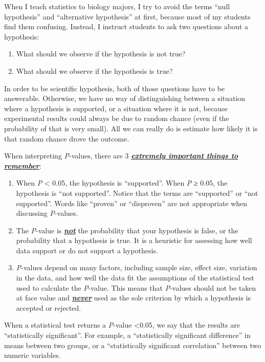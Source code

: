 \documentclass[
  13,
  letterpaper,
]{report}
\begin{document}
When I teach statistics to biology majors, I try to avoid the terms
``null hypothesis'' and ``alternative hypothesis'' at first, because
most of my students find them confusing. Instead, I instruct students to
ask two questions about a hypothesis:

\begin{enumerate}
\def\labelenumi{\arabic{enumi}.}
\item
  What should we observe if the hypothesis is not true?
\item
  What should we observe if the hypothesis is true?
\end{enumerate}

In order to be scientific hypothesis, both of those questions have to be
answerable. Otherwise, we have no way of distinguishing between a
situation where a hypothesis is supported, or a situation where it is
not, because experimental results could always be due to random chance
(even if the probability of that is very small). All we can really do is
estimate how likely it is that random chance drove the outcome.

When interpreting \emph{P}-values, there are 3
\ul{\textbf{\emph{extremely important things to remember}}}:

\begin{enumerate}
\def\labelenumi{\arabic{enumi}.}
\item
  When \emph{P} \textless{} 0.05, the hypothesis is ``supported''. When
  \emph{P} ≥ 0.05, the hypothesis is ``not supported''. Notice that the
  terms are ``supported'' or ``not supported''. Words like ``proven'' or
  ``disproven'' are not appropriate when discussing \emph{P}-values.
\item
  The \emph{P}-value is \ul{\textbf{\emph{not}}} the probability that
  your hypothesis is false, or the probability that a hypothesis is
  true. It is a heuristic for assessing how well data support or do not
  support a hypothesis.
\item
  \emph{P}-values depend on many factors, including sample size, effect
  size, variation in the data, and how well the data fit the assumptions
  of the statistical test used to calculate the \emph{P}-value. This
  means that \emph{P}-values should not be taken at face value and
  \ul{\textbf{\emph{never}}} used as the sole criterion by which a
  hypothesis is accepted or rejected.
\end{enumerate}

When a statistical test returns a \emph{P}-value \textless0.05, we say
that the results are ``statistically significant''. For example, a
``statistically significant difference'' in means between two groups, or
a ``statistically significant correlation'' between two numeric
variables.
\end{document}

